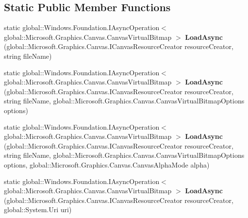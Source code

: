 \subsection*{Static Public Member Functions}
\begin{DoxyCompactItemize}
\item 
\mbox{\label{class_microsoft_1_1_graphics_1_1_canvas_1_1_canvas_virtual_bitmap_a8596f4617ef7a7e9c1a1464d4674e40c}} 
static global\+::\+Windows.\+Foundation.\+I\+Async\+Operation$<$ global\+::\+Microsoft.\+Graphics.\+Canvas.\+Canvas\+Virtual\+Bitmap $>$ {\bfseries Load\+Async} (global\+::\+Microsoft.\+Graphics.\+Canvas.\+I\+Canvas\+Resource\+Creator resource\+Creator, string file\+Name)
\item 
\mbox{\label{class_microsoft_1_1_graphics_1_1_canvas_1_1_canvas_virtual_bitmap_a8f0bf16c94a9957cd9b4f30b7c8369f8}} 
static global\+::\+Windows.\+Foundation.\+I\+Async\+Operation$<$ global\+::\+Microsoft.\+Graphics.\+Canvas.\+Canvas\+Virtual\+Bitmap $>$ {\bfseries Load\+Async} (global\+::\+Microsoft.\+Graphics.\+Canvas.\+I\+Canvas\+Resource\+Creator resource\+Creator, string file\+Name, global\+::\+Microsoft.\+Graphics.\+Canvas.\+Canvas\+Virtual\+Bitmap\+Options options)
\item 
\mbox{\label{class_microsoft_1_1_graphics_1_1_canvas_1_1_canvas_virtual_bitmap_a72cf413902f0758c4707d6fc9c560914}} 
static global\+::\+Windows.\+Foundation.\+I\+Async\+Operation$<$ global\+::\+Microsoft.\+Graphics.\+Canvas.\+Canvas\+Virtual\+Bitmap $>$ {\bfseries Load\+Async} (global\+::\+Microsoft.\+Graphics.\+Canvas.\+I\+Canvas\+Resource\+Creator resource\+Creator, string file\+Name, global\+::\+Microsoft.\+Graphics.\+Canvas.\+Canvas\+Virtual\+Bitmap\+Options options, global\+::\+Microsoft.\+Graphics.\+Canvas.\+Canvas\+Alpha\+Mode alpha)
\item 
\mbox{\label{class_microsoft_1_1_graphics_1_1_canvas_1_1_canvas_virtual_bitmap_ad38275a64145b2d51079b6c5e251fab4}} 
static global\+::\+Windows.\+Foundation.\+I\+Async\+Operation$<$ global\+::\+Microsoft.\+Graphics.\+Canvas.\+Canvas\+Virtual\+Bitmap $>$ {\bfseries Load\+Async} (global\+::\+Microsoft.\+Graphics.\+Canvas.\+I\+Canvas\+Resource\+Creator resource\+Creator, global\+::\+System.\+Uri uri)

\end{DoxyCompactItemize}
